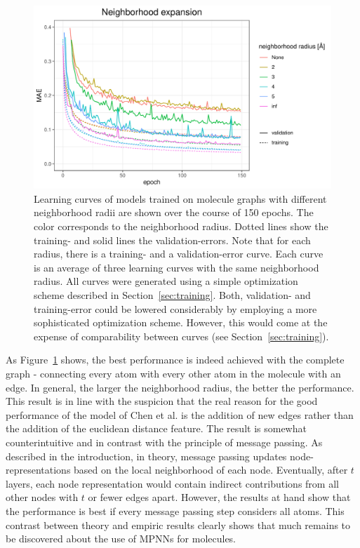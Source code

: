 \begin{figure}[H]
	\includegraphics[width=\linewidth]{figures/neighborhood-expansion}
	
	\caption{Learning curves of models trained on molecule graphs with different neighborhood radii are shown over the course of 150 epochs. The color corresponds to the neighborhood radius. Dotted lines show the training- and solid lines the validation-errors. Note that for each radius, there is a training- and a validation-error curve. Each curve is an average of three learning curves with the same neighborhood radius. All curves were generated using a simple optimization scheme described in Section~\ref{sec:training}. Both, validation- and training-error could be lowered considerably by employing a more sophisticated optimization scheme. However, this would come at the expense of comparability between curves (see Section~\ref{sec:training}).}
	\label{fig:neighborhood-expansion}
\end{figure}

As Figure~\ref{fig:neighborhood-expansion} shows, the best performance is indeed achieved with the complete graph - connecting every atom with every other atom in the molecule with an edge. In general, the larger the neighborhood radius, the better the performance. This result is in line with the suspicion that the real reason for the good performance of the model of Chen et al. is the addition of new edges rather than the addition of the euclidean distance feature.
The result is somewhat counterintuitive and in contrast with the principle of message passing. As described in the introduction, in theory, message passing updates node-representations based on the local neighborhood of each node. Eventually, after $t$ layers, each node representation would contain indirect contributions from all other nodes with $t$ or fewer edges apart. However, the results at hand show that the performance is best if every message passing step considers all atoms. This contrast between theory and empiric results clearly shows that much remains to be discovered about the use of MPNNs for molecules.

